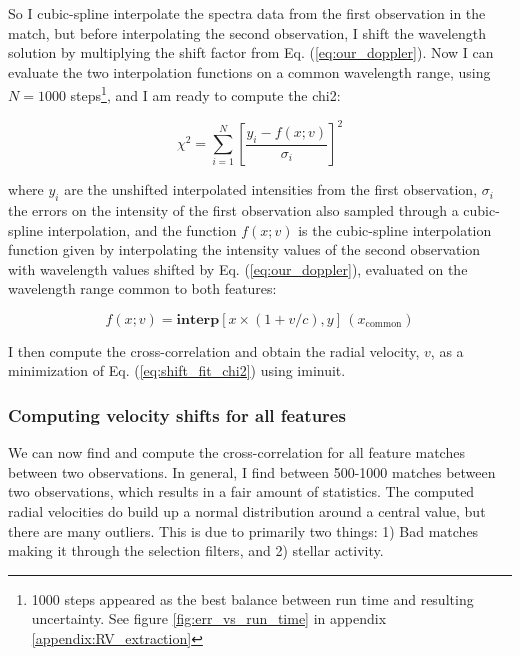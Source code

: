     So I cubic-spline interpolate the spectra data from the first observation in the match, but before interpolating the second observation, I shift the wavelength solution by multiplying the shift factor from Eq. (\ref{eq:our_doppler}). Now I can evaluate the two interpolation functions on a common wavelength range, using $N=1000$ steps\footnote{1000 steps appeared as the best balance between run time and resulting uncertainty. See figure \ref{fig:err_vs_run_time} in appendix \ref{appendix:RV_extraction}}, and I am ready to compute the chi2:
        
    \begin{equation}
        \label{eq:shift_fit_chi2}
        \chi^{2}=\sum_{i=1}^{N}\left[\frac{y_{i}-f(x; v)}{\sigma_{i}}\right]^{2}
    \end{equation}
    
    where $y_i$ are the unshifted interpolated intensities from the first observation, $\sigma_i$ the errors on the intensity of the first observation also sampled through a cubic-spline interpolation, and the function $f(x; v)$ is the cubic-spline interpolation function given by interpolating the intensity values of the second observation with wavelength values shifted by Eq. (\ref{eq:our_doppler}), evaluated on the wavelength range common to both features: 
    
    \begin{equation}
        f(x; v) = \textbf{interp}[x \times ( 1 + v/c), y]\,(x_\text{common})
    \end{equation}
    
    I then compute the cross-correlation and obtain the radial velocity, $v$, as a minimization of Eq. (\ref{eq:shift_fit_chi2}) using iminuit.
    
    \subsubsection{Computing velocity shifts for all features}

    We can now find and compute the cross-correlation for all feature matches between two observations. In general, I find between 500-1000 matches between two observations, which results in a fair amount of statistics. The computed radial velocities do build up a normal distribution around a central value, but there are many outliers. This is due to primarily two things: 1) Bad matches making it through the selection filters, and 2) stellar activity.
    
